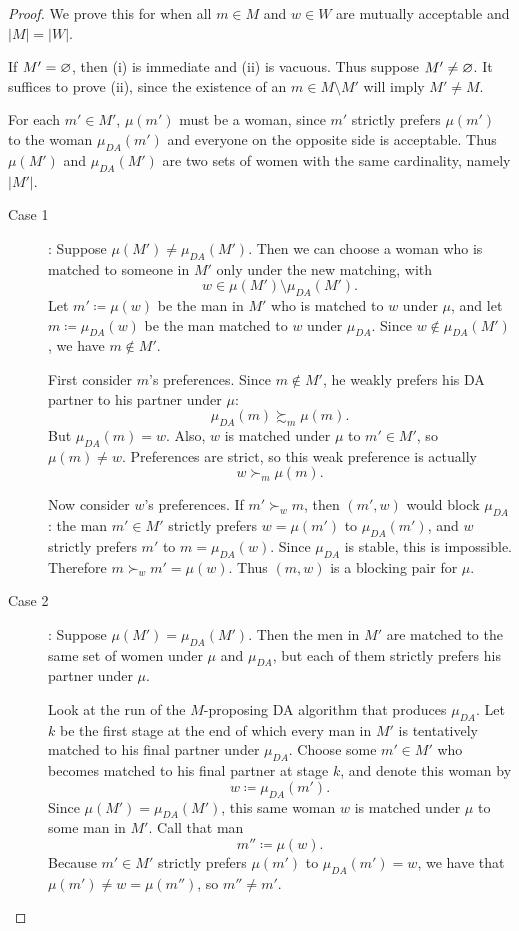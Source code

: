 \begin{proof}
	We prove this for when all $m \in M$ and $w \in W$ are mutually acceptable and $\left| M \right| = \left| W \right|$.

	If $M' = \varnothing$, then (i) is immediate and (ii) is vacuous. Thus suppose $M' \ne \varnothing$.
	It suffices to prove (ii), since the existence of an $m \in M \setminus M'$ will imply $M' \ne M$.

	For each $m' \in M'$, $\mu(m')$ must be a woman, since $m'$ strictly prefers $\mu(m')$ to the woman $\mu_{DA}(m')$ and everyone on the opposite side is acceptable.
	Thus $\mu(M')$ and $\mu_{DA}(M')$ are two sets of women with the same cardinality, namely $\left| M' \right|$.

	\begin{description}
		\item[Case 1]: Suppose $\mu(M') \ne \mu_{DA}(M')$.
		Then we can choose a woman who is matched to someone in $M'$ only under the new matching, with \[
			w \in \mu(M') \setminus \mu_{DA}(M')
		.\]
		Let $m' \coloneqq \mu(w)$ be the man in $M'$ who is matched to $w$ under $\mu$, and let $m \coloneqq \mu_{DA}(w)$ be the man matched to $w$ under $\mu_{DA}$.
		Since $w \not\in \mu_{DA}(M')$, we have $m \not\in M'$.

		First consider $m$'s preferences.
		Since $m \not\in M'$, he weakly prefers his DA partner to his partner under $\mu$: \[
			\mu_{DA}(m) \succsim_m \mu(m)
		.\]
		But $\mu_{DA}(m) = w$.
		Also, $w$ is matched under $\mu$ to $m' \in M'$, so $\mu(m) \ne w$.
		Preferences are strict, so this weak preference is actually \[
			w \succ_m \mu(m)
		.\]

		Now consider $w$'s preferences.
		If $m' \succ_w m$, then $(m',w)$ would block $\mu_{DA}$: the man $m' \in M'$ strictly prefers $w=\mu(m')$ to $\mu_{DA}(m')$, and $w$ strictly prefers $m'$ to $m=\mu_{DA}(w)$.
		Since $\mu_{DA}$ is stable, this is impossible.
		Therefore $m \succ_w m'=\mu(w)$.
		Thus $(m,w)$ is a blocking pair for $\mu$.
		\item[Case 2]: Suppose $\mu(M') = \mu_{DA}(M')$.
		Then the men in $M'$ are matched to the same set of women under $\mu$ and $\mu_{DA}$, but each of them strictly prefers his partner under $\mu$.

		Look at the run of the $M$-proposing DA algorithm that produces $\mu_{DA}$.
		Let $k$ be the first stage at the end of which every man in $M'$ is tentatively matched to his final partner under $\mu_{DA}$.
		Choose some $m' \in M'$ who becomes matched to his final partner at stage $k$, and denote this woman by \[
			w \coloneqq \mu_{DA}(m')
		.\]
		Since $\mu(M') = \mu_{DA}(M')$, this same woman $w$ is matched under $\mu$ to some man in $M'$.
		Call that man \[
			m'' \coloneqq \mu(w)
		.\]
		Because $m' \in M'$ strictly prefers $\mu(m')$ to $\mu_{DA}(m') = w$, we have that $\mu(m') \ne w = \mu(m'')$, so $m'' \ne m'$.


\end{description}
\end{proof}
